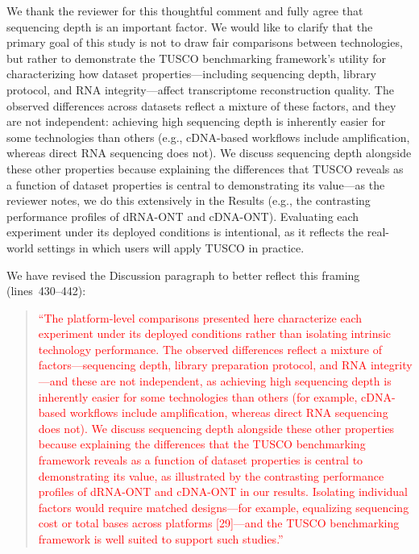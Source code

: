 \documentclass[11pt]{article}
\newcommand{\tuscoBenchmarkingFramework}{TUSCO benchmarking framework}
\begin{document}
\begin{responseboxnew}
We thank the reviewer for this thoughtful comment and fully agree that sequencing depth is an important factor. We would like to clarify that the primary goal of this study is not to draw fair comparisons between technologies, but rather to demonstrate the \tuscoBenchmarkingFramework{}'s utility for characterizing how dataset properties---including sequencing depth, library protocol, and RNA integrity---affect transcriptome reconstruction quality. The observed differences across datasets reflect a mixture of these factors, and they are not independent: achieving high sequencing depth is inherently easier for some technologies than others (e.g., cDNA-based workflows include amplification, whereas direct RNA sequencing does not). We discuss sequencing depth alongside these other properties because explaining the differences that TUSCO reveals as a function of dataset properties is central to demonstrating its value---as the reviewer notes, we do this extensively in the Results (e.g., the contrasting performance profiles of dRNA-ONT and cDNA-ONT). Evaluating each experiment under its deployed conditions is intentional, as it reflects the real-world settings in which users will apply TUSCO in practice.

We have revised the Discussion paragraph to better reflect this framing (lines~430--442):

\begin{quote}
\textcolor{red}{``The platform-level comparisons presented here characterize each experiment under its deployed conditions rather than isolating intrinsic technology performance. The observed differences reflect a mixture of factors---sequencing depth, library preparation protocol, and RNA integrity---and these are not independent, as achieving high sequencing depth is inherently easier for some technologies than others (for example, cDNA-based workflows include amplification, whereas direct RNA sequencing does not). We discuss sequencing depth alongside these other properties because explaining the differences that the \tuscoBenchmarkingFramework{} reveals as a function of dataset properties is central to demonstrating its value, as illustrated by the contrasting performance profiles of dRNA-ONT and cDNA-ONT in our results. Isolating individual factors would require matched designs---for example, equalizing sequencing cost or total bases across platforms [29]---and the \tuscoBenchmarkingFramework{} is well suited to support such studies.''}
\end{quote}
\end{responseboxnew}
\end{document}
